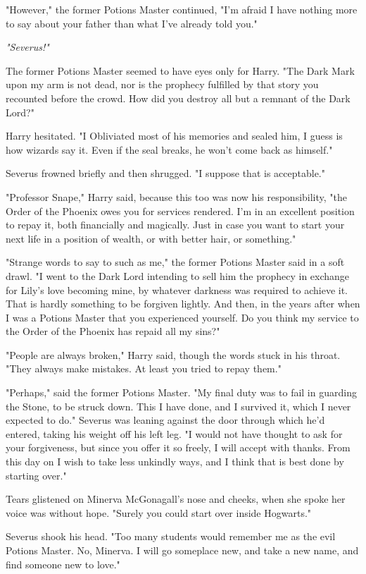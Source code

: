 "However," the former Potions Master continued, "I'm afraid I have nothing more
to say about your father than what I've already told you."

\emph{"Severus!"}

The former Potions Master seemed to have eyes only for Harry. "The Dark Mark
upon my arm is not dead, nor is the prophecy fulfilled by that story you
recounted before the crowd. How did you destroy all but a remnant of the Dark
Lord?"

Harry hesitated. "I Obliviated most of his memories and{\el} sealed him, I
guess is how wizards say it. Even if the seal breaks, he won't come back as
himself."

Severus frowned briefly and then shrugged. "I suppose that is acceptable."

"Professor Snape," Harry said, because this too was now his responsibility,
"the Order of the Phoenix owes you for services rendered. I'm in an excellent
position to repay it, both financially and magically. Just in case you want to
start your next life in a position of wealth, or with better hair, or
something."

"Strange words to say to such as me," the former Potions Master said in a soft
drawl. "I went to the Dark Lord intending to sell him the prophecy in exchange
for Lily's love becoming mine, by whatever darkness was required to achieve it.
That is hardly something to be forgiven lightly. And then, in the years after
when I was a Potions Master{\el} that you experienced yourself. Do you think
my service to the Order of the Phoenix has repaid all my sins?"

"People are always broken," Harry said, though the words stuck in his throat.
"They always make mistakes. At least you tried to repay them."

"Perhaps," said the former Potions Master. "My final duty was to fail in
guarding the Stone, to be struck down. This I have done, and I survived it,
which I never expected to do." Severus was leaning against the door through
which he'd entered, taking his weight off his left leg. "I would not have
thought to ask for your forgiveness, but since you offer it so freely, I will
accept with thanks. From this day on I wish to take less unkindly ways, and I
think that is best done by starting over."

Tears glistened on Minerva McGonagall's nose and cheeks, when she spoke her
voice was without hope. "Surely you could start over inside Hogwarts."

Severus shook his head. "Too many students would remember me as the evil
Potions Master. No, Minerva. I will go someplace new, and take a new name, and
find someone new to love."

